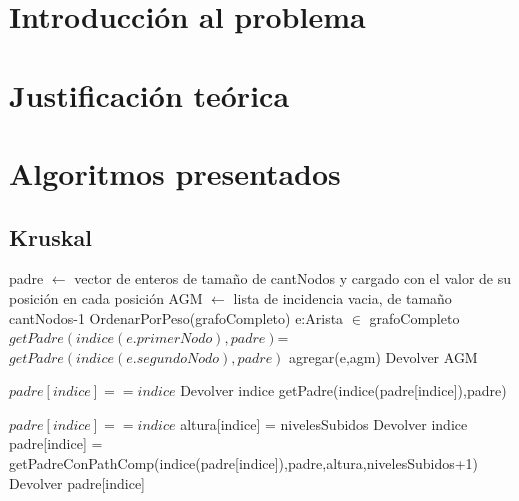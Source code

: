 \documentclass[12pt,a4paper]{article}
\begin{document}

\fecha{\today}



\maketitle

\newpage
%

\section{Introducción al problema}
\section{Justificación teórica}
\section{Algoritmos presentados}
\subsection{Kruskal}
\begin{codebox}
\li padre $\gets$ vector de enteros de tamaño de cantNodos y cargado con el valor de su posición en cada posición
\li AGM $\gets$ lista de incidencia vacia, de tamaño cantNodos-1
\li OrdenarPorPeso(grafoCompleto)
\li \For e:Arista $\in$ grafoCompleto 
\li \If $getPadre(indice(e.primerNodo), padre) $=$ getPadre(indice(e.segundoNodo),padre)$ \Then
\li agregar(e,agm)
\li \End
\li \End
\li Devolver AGM
\end{codebox}

\begin{codebox}
\li \If $padre[indice] == indice$ \Then
\li Devolver indice
\li \Else
\li getPadre(indice(padre[indice]),padre)
\li \End
\end{codebox}


\begin{codebox}
\li \If $padre[indice] == indice$ \Then
\li altura[indice] = nivelesSubidos
\li Devolver indice
\li \Else
\li padre[indice] = getPadreConPathComp(indice(padre[indice]),padre,altura,nivelesSubidos+1)
\li Devolver padre[indice]
\li \End
\end{codebox}
\end{document}
